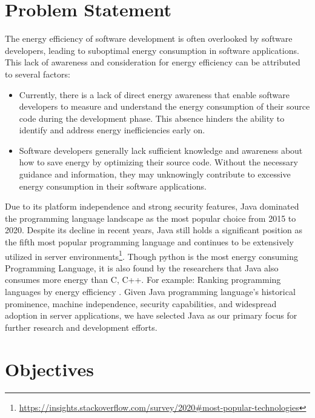 \vspace{-10pt}
\section{Problem Statement}
\label{sec:problem_statement}
The energy efficiency of software development is often overlooked by software developers, leading to suboptimal energy consumption in software applications. This lack of awareness and consideration for energy efficiency can be attributed to several factors:

\begin{itemize}
\vspace{-5pt}
\item Currently, there is a lack of direct energy awareness that enable software developers to measure and understand the energy consumption of their source code during the development phase. This absence hinders the ability to identify and address energy inefficiencies early on.
\vspace{-5pt}
\item Software developers generally lack sufficient knowledge and awareness about how to save energy by optimizing their source code. Without the necessary guidance and information, they may unknowingly contribute to excessive energy consumption in their software applications.
\end{itemize}

Due to its platform independence and strong security features, Java dominated the programming language landscape as the most popular choice from 2015 to 2020. Despite its decline in recent years, Java still holds a significant position as the fifth most popular programming language and continues to be extensively utilized in server environments\footnote{\url{https://insights.stackoverflow.com/survey/2020#most-popular-technologies}}. Though python is the most energy consuming Programming Language, it is also found by the researchers that Java also consumes more energy than C, C++. For example: Ranking programming languages by energy eﬃciency \cite{DBLP:journals/scp/PereiraCRRCFS21}. Given Java programming language's historical prominence, machine independence, security capabilities, and widespread adoption in server applications, we have selected Java as our primary focus for further research and development efforts.

\vspace{-10pt}
\section{Objectives}
\label{sec:Objectives}

